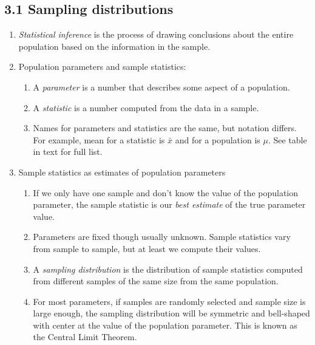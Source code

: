 \documentclass{article}
\begin{document}
\subsection{3.1 Sampling distributions}
\begin{enumerate}

\item \emph{Statistical inference} is the process of drawing conclusions about the entire population based on the information in the sample.

 
\item Population parameters and sample statistics:
\begin{enumerate}
\item A \emph{parameter} is a number that describes some aspect of a population.
\item A \emph{statistic} is a number computed from the data in a sample.
\item Names for parameters and statistics are the same, but notation differs. For example, mean for a statistic is $\bar{x}$ and for a population is $\mu$. See table in text for full list.
\end{enumerate}

\item Sample statistics as estimates of population parameters
\begin{enumerate}
\item If we only have one sample and don't know the value of the population parameter, the sample statistic is our \emph{best estimate} of the true parameter value.
\item Parameters are fixed though usually unknown. Sample statistics vary from sample to sample, but at least we compute their values.
\item A \emph{sampling distribution} is the distribution of sample statistics computed from different samples of the same size from the same population.
\item For most parameters, if samples are randomly selected and sample size is large enough, the sampling distribution will be symmetric and bell-shaped with center at the value of the population parameter. This is known as the Central Limit Theorem. 
\end{enumerate}


\end{enumerate}
\end{document}
